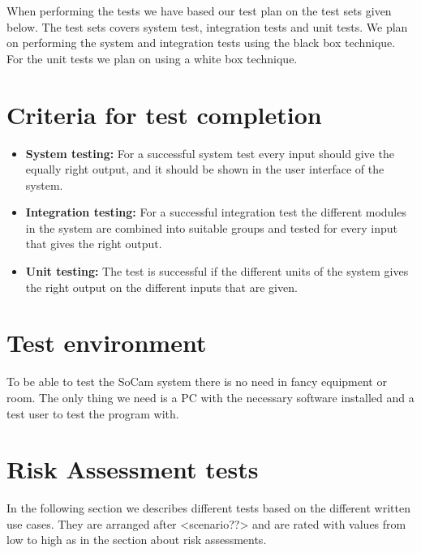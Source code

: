 	When performing the tests we have based our test plan on the test sets given below. The test sets covers system test, integration tests and unit tests. We plan on performing the system and integration tests using the black box technique. For the unit tests we plan on using a white box technique. 

	\section{Criteria for test completion}

		\begin{itemize}
			\item {\bf System testing:} For a successful system test every input should give the equally right 
			output, and it should be shown in the user interface of the system. 
			\item {\bf Integration testing:} For a successful integration test the different modules in the 
			system are combined into suitable groups and tested for every input that gives the right output.  
			\item {\bf Unit testing:} The test is successful if the different units of the system gives the 
			right output on the different inputs that are given. 
		\end{itemize}

	\section {Test environment}

	To be able to test the SoCam system there is no need in fancy equipment or room. The only thing we need 
	is a PC with the necessary software installed and a test user to test the program with.

	\section {Risk Assessment tests}

	In the following section we describes different tests based on the different written use cases. 
	They are arranged after <scenario??> and are rated with values from low to high as in the section 
	about risk assessments. 


